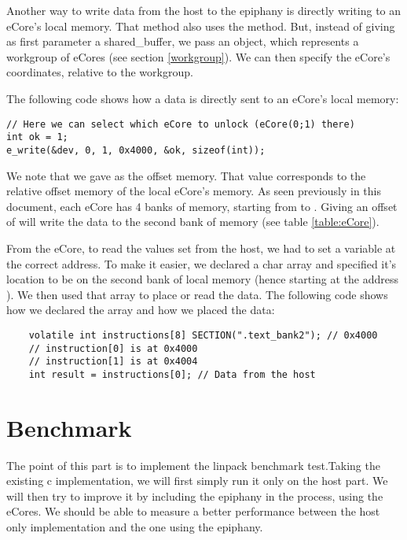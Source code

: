 Another way to write data from the host to the \gls{epiphany} is directly writing to an \gls{eCore}'s local memory. That method also uses the  method. But, instead of giving as first parameter a shared\_buffer, we pass an  object, which represents a workgroup of \glspl{eCore} (see section \ref{workgroup}). We can then specify the \gls{eCore}'s coordinates, relative to the workgroup. 

The following code shows how a data is directly sent to an \gls{eCore}'s local memory:

\begin{lstlisting}
// Here we can select which eCore to unlock (eCore(0;1) there)
int ok = 1;
e_write(&dev, 0, 1, 0x4000, &ok, sizeof(int));
\end{lstlisting}

We note that we gave  as the offset memory. That value corresponds to the relative offset memory of the local \gls{eCore}'s memory. As seen previously in this document, each \gls{eCore} has 4 banks of memory, starting from  to . Giving an offset of  will write the data to the second bank of memory (see table \ref{table:eCore}).

From the \gls{eCore}, to read the values set from the host, we had to set a variable at the correct address. To make it easier, we declared a char array and specified it's location to be on the second bank of local memory (hence starting at the address ). We then used that array to place or read the data. The following code shows how we declared the array and how we placed the data:

\begin{lstlisting}
	volatile int instructions[8] SECTION(".text_bank2"); // 0x4000
	// instruction[0] is at 0x4000
	// instruction[1] is at 0x4004
	int result = instructions[0]; // Data from the host
\end{lstlisting}


\section{Benchmark} \label{benchmark}

The point of this part is to implement the linpack benchmark test.Taking the existing c implementation, we will first simply run it only on the host part. We will then try to improve it by including the \gls{epiphany} in the process, using the \glspl{eCore}. We should be able to measure a better performance between the host only implementation and the one using the \gls{epiphany}.

